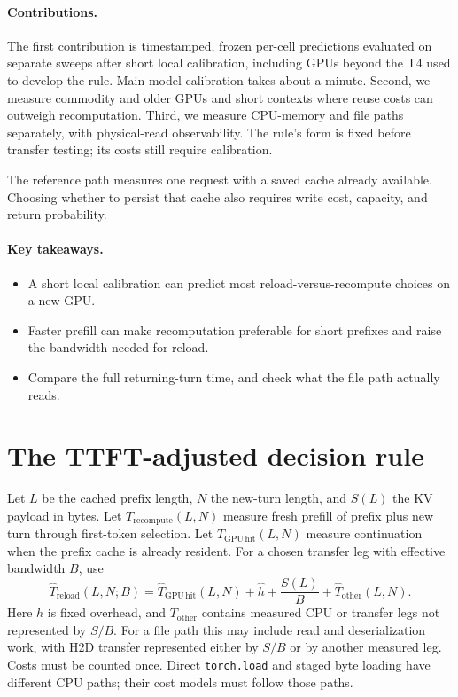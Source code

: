 \documentclass[10pt]{article}
\begin{document}
\paragraph{Contributions.}
The first contribution is timestamped, frozen per-cell predictions evaluated on separate sweeps after short local calibration, including GPUs beyond the T4 used to develop the rule. Main-model calibration takes about a minute. Second, we measure commodity and older GPUs and short contexts where reuse costs can outweigh recomputation. Third, we measure CPU-memory and file paths separately, with physical-read observability. The rule's form is fixed before transfer testing; its costs still require calibration.

The reference path measures one request with a saved cache already available. Choosing whether to persist that cache also requires write cost, capacity, and return probability.

\paragraph{Key takeaways.}
\begin{itemize}
\item A short local calibration can predict most reload-versus-recompute choices on a new GPU.
\item Faster prefill can make recomputation preferable for short prefixes and raise the bandwidth needed for reload.
\item Compare the full returning-turn time, and check what the file path actually reads.
\end{itemize}

\section{The TTFT-adjusted decision rule}\label{sec:rule}
Let $L$ be the cached prefix length, $N$ the new-turn length, and $S(L)$ the KV payload in bytes. Let $T_{\mathrm{recompute}}(L,N)$ measure fresh prefill of prefix plus new turn through first-token selection. Let $T_{\mathrm{GPU\,hit}}(L,N)$ measure continuation when the prefix cache is already resident. For a chosen transfer leg with effective bandwidth $B$, use
\begin{equation}
 \widehat T_{\mathrm{reload}}(L,N;B)
 = \widehat T_{\mathrm{GPU\,hit}}(L,N)+\widehat h
 +\frac{S(L)}{B}+\widehat T_{\mathrm{other}}(L,N).
 \label{eq:reload}
\end{equation}
Here $h$ is fixed overhead, and $T_{\mathrm{other}}$ contains measured CPU or transfer legs not represented by $S/B$. For a file path this may include read and deserialization work, with H2D transfer represented either by $S/B$ or by another measured leg. Costs must be counted once. Direct \texttt{torch.load} and staged byte loading have different CPU paths; their cost models must follow those paths.
\end{document}
